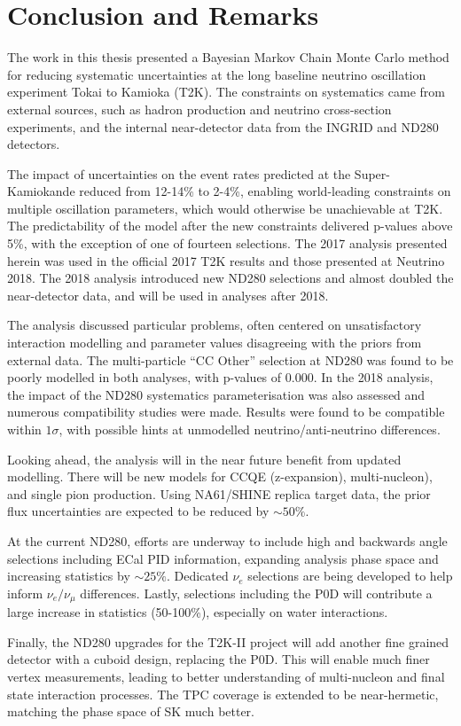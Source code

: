 \chapter{Conclusion and Remarks}
\label{chap:conclusion}
The work in this thesis presented a Bayesian Markov Chain Monte Carlo method for reducing systematic uncertainties at the long baseline neutrino oscillation experiment Tokai to Kamioka (T2K). The constraints on systematics came from external sources, such as hadron production and neutrino cross-section experiments, and the internal near-detector data from the INGRID and ND280 detectors.

The impact of uncertainties on the event rates predicted at the Super-Kamiokande reduced from 12-14\% to 2-4\%, enabling world-leading constraints on multiple oscillation parameters, which would otherwise be unachievable at T2K. The predictability of the model after the new constraints delivered p-values above 5\%, with the exception of one of fourteen selections. The 2017 analysis presented herein was used in the official 2017 T2K results and those presented at Neutrino 2018. The 2018 analysis introduced new ND280 selections and almost doubled the near-detector data, and will be used in analyses after 2018.

The analysis discussed particular problems, often centered on unsatisfactory interaction modelling and parameter values disagreeing with the priors from external data. The multi-particle ``CC Other'' selection at ND280 was found to be poorly modelled in both analyses, with p-values of 0.000. In the 2018 analysis, the impact of the ND280 systematics parameterisation was also assessed and numerous compatibility studies were made. Results were found to be compatible within $1\sigma$, with possible hints at unmodelled neutrino/anti-neutrino differences.

Looking ahead, the analysis will in the near future benefit from updated modelling. There will be new models for CCQE (z-expansion\cite{z-exp}), multi-nucleon\cite{nieves1}), and single pion production\cite{thesis_minoo}. Using NA61/SHINE replica target data, the prior flux uncertainties are expected to be reduced by $\sim50\%$\cite{flux_red}.

At the current ND280, efforts are underway to include high and backwards angle selections including ECal PID information, expanding analysis phase space and increasing statistics by $\sim25\%$. Dedicated $\nu_e$ selections are being developed to help inform $\nu_e/\nu_\mu$ differences. Lastly, selections including the P0D will contribute a large increase in statistics (50-100\%), especially on water interactions.

Finally, the ND280 upgrades\cite{t2k_upgrades} for the T2K-II project\cite{t2k_ii} will add another fine grained detector with a cuboid design, replacing the P0D. This will enable much finer vertex measurements, leading to better understanding of multi-nucleon and final state interaction processes. The TPC coverage is extended to be near-hermetic, matching the phase space of SK much better.

